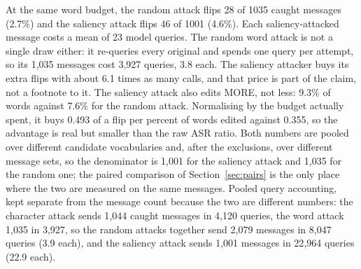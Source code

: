 At the same word budget, the random attack flips 28 of 1035 caught messages (2.7\%) and the saliency attack flips 46 of 1001 (4.6\%).
Each saliency-attacked message costs a mean of 23 model queries. The random word attack is not a single draw either: it re-queries every original and spends one query per attempt, so its 1{,}035 messages cost 3{,}927 queries, 3.8 each. The saliency attacker buys its extra flips with about 6.1 times as many calls, and that price is part of the claim, not a footnote to it.
The saliency attack also edits MORE, not less: 9.3\% of words against 7.6\% for the random attack. Normalising by the budget actually spent, it buys 0.493 of a flip per percent of words edited against 0.355, so the advantage is real but smaller than the raw ASR ratio.
Both numbers are pooled over different candidate vocabularies and, after the exclusions, over different message sets, so the denominator is 1{,}001 for the saliency attack and 1{,}035 for the random one; the paired comparison of Section~\ref{sec:pairs} is the only place where the two are measured on the same messages.
Pooled query accounting, kept separate from the message count because the two are different numbers: the character attack sends 1{,}044 caught messages in 4{,}120 queries, the word attack 1{,}035 in 3{,}927, so the random attacks together send 2{,}079 messages in 8{,}047 queries (3.9 each), and the saliency attack sends 1{,}001 messages in 22{,}964 queries (22.9 each).
